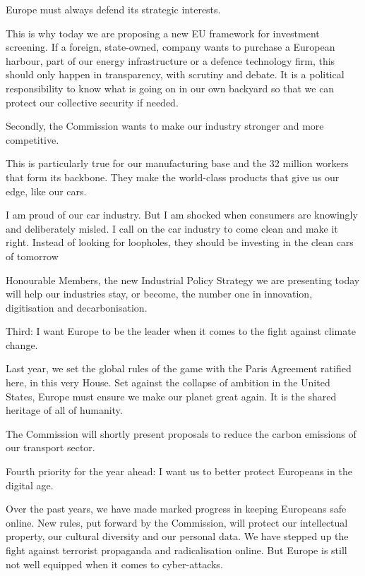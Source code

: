 \documentclass[a4paper,11pt]{article}
\begin{document}
Europe must always defend its strategic interests.

This is why today we are proposing a new EU framework for investment screening. If a foreign, state-owned, company wants to purchase a European harbour, part of our energy infrastructure or a defence technology firm, this should only happen in transparency, with scrutiny and debate. It is a political responsibility to know what is going on in our own backyard so that we can protect our collective security if needed.

 

Secondly, the Commission wants to make our industry stronger and more competitive.

This is particularly true for our manufacturing base and the 32 million workers that form its backbone. They make the world-class products that give us our edge, like our cars.

I am proud of our car industry. But I am shocked when consumers are knowingly and deliberately misled. I call on the car industry to come clean and make it right. Instead of looking for loopholes, they should be investing in the clean cars of tomorrow

Honourable Members, the new Industrial Policy Strategy we are presenting today will help our industries stay, or become, the number one in innovation, digitisation and decarbonisation.

 

Third: I want Europe to be the leader when it comes to the fight against climate change.

Last year, we set the global rules of the game with the Paris Agreement ratified here, in this very House. Set against the collapse of ambition in the United States, Europe must ensure we make our planet great again. It is the shared heritage of all of humanity.

The Commission will shortly present proposals to reduce the carbon emissions of our transport sector.

 

Fourth priority for the year ahead: I want us to better protect Europeans in the digital age.

Over the past years, we have made marked progress in keeping Europeans safe online. New rules, put forward by the Commission, will protect our intellectual property, our cultural diversity and our personal data. We have stepped up the fight against terrorist propaganda and radicalisation online. But Europe is still not well equipped when it comes to cyber-attacks.
\end{document}
